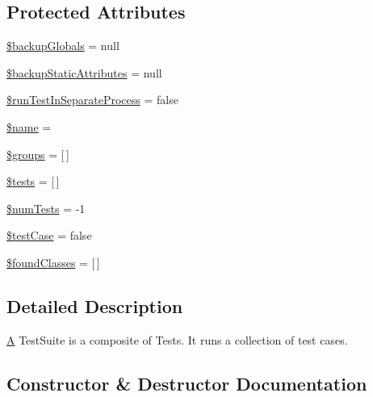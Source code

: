 \subsection*{Protected Attributes}
\begin{DoxyCompactItemize}
\item 
\mbox{\hyperlink{class_p_h_p_unit___framework___test_suite_a7c6af4e36636a61ec139a77a1c07cffe}{\$backup\+Globals}} = null
\item 
\mbox{\hyperlink{class_p_h_p_unit___framework___test_suite_a563497416305ba3d1caeb0dbe4454bb3}{\$backup\+Static\+Attributes}} = null
\item 
\mbox{\hyperlink{class_p_h_p_unit___framework___test_suite_a7e113cd6fbfe94d18fe43cf7bbd0f899}{\$run\+Test\+In\+Separate\+Process}} = false
\item 
\mbox{\hyperlink{class_p_h_p_unit___framework___test_suite_ab2fc40d43824ea3e1ce5d86dee0d763b}{\$name}} = \textquotesingle{}\textquotesingle{}
\item 
\mbox{\hyperlink{class_p_h_p_unit___framework___test_suite_a1af3c911abb4f6414a86954705266327}{\$groups}} = \mbox{[}$\,$\mbox{]}
\item 
\mbox{\hyperlink{class_p_h_p_unit___framework___test_suite_a6d7f4b753e7eb18b328a7eeba5e0094f}{\$tests}} = \mbox{[}$\,$\mbox{]}
\item 
\mbox{\hyperlink{class_p_h_p_unit___framework___test_suite_a85a19fb72faf893f5bc2fc25058c2223}{\$num\+Tests}} = -\/1
\item 
\mbox{\hyperlink{class_p_h_p_unit___framework___test_suite_ab3a28d78c2905f98818a9bee6fb95b35}{\$test\+Case}} = false
\item 
\mbox{\hyperlink{class_p_h_p_unit___framework___test_suite_a2e548e971d1a4176c18fa7b61479ea79}{\$found\+Classes}} = \mbox{[}$\,$\mbox{]}
\end{DoxyCompactItemize}


\subsection{Detailed Description}
\mbox{\hyperlink{class_a}{A}} Test\+Suite is a composite of Tests. It runs a collection of test cases. 

\subsection{Constructor \& Destructor Documentation}
\mbox{\label{class_p_h_p_unit___framework___test_suite_ad59b640510350acc22bee8a3738dacff}} 
